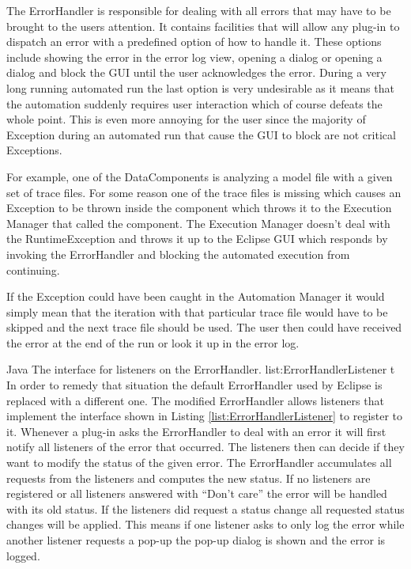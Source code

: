 The ErrorHandler is responsible for dealing with all errors that may have to be brought
to the users attention. It contains facilities that will allow any plug-in to dispatch an
error with a predefined option of how to handle it. These options include showing the error
in the error log view, opening a dialog or opening a dialog and block the \ac{GUI} until the user
acknowledges the error. During a very long running automated run the last option is very
undesirable as it means that the automation suddenly requires user interaction which of course
defeats the whole point. This is even more annoying for the user since the majority of
Exception during an automated run that cause the \ac{GUI} to block are not critical Exceptions.

For example, one of the DataComponents is analyzing a model file with a given set of trace files.
For some reason one of the trace files is missing which causes an Exception to be thrown inside
the component which throws it to the Execution Manager that called the component. The Execution
Manager doesn't deal with the RuntimeException and throws it up to the Eclipse \ac{GUI} which
responds by invoking the ErrorHandler and blocking the automated execution from continuing. 

If the Exception could have been caught in the Automation Manager it would simply mean that
the iteration with that particular trace file would have to be skipped and the next trace file
should be used. The user then could have received the error at the end of the run or look it up
in the error log.

\listingjava
{}
{Java}
{The interface for listeners on the ErrorHandler.}
{list:ErrorHandlerListener}
{t}
In order to remedy that situation the default ErrorHandler used by Eclipse is replaced with 
a different one. The modified ErrorHandler allows listeners that implement the interface
shown in Listing \ref{list:ErrorHandlerListener} to register to it. Whenever
a plug-in asks the ErrorHandler to deal with an error it will first notify all listeners
of the error that occurred. The listeners then can decide if they want to modify
the status of the given error. The ErrorHandler accumulates all requests from the listeners
and computes the new status. If no listeners are registered or all listeners answered
with ``Don't care'' the error will be handled with its old status. If the listeners
did request a status change all requested status changes will be applied. This
means if one listener asks to only log the error while another listener requests a pop-up
the pop-up dialog is shown and the error is logged.

